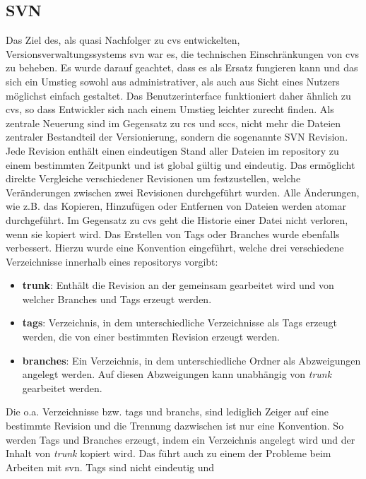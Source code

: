 \subsection{SVN}\label{sec:svn}
Das Ziel des, als quasi Nachfolger zu \acrshort{cvs} entwickelten,
Versionsverwaltungssystems \acrfull{svn} war es, die technischen
Einschränkungen von \acrshort{cvs} zu beheben. Es wurde darauf geachtet, dass
es als Ersatz fungieren kann und das sich ein Umstieg sowohl aus
administrativer, als auch aus Sicht eines Nutzers möglichst einfach gestaltet.
Das Benutzerinterface funktioniert daher ähnlich zu \acrshort{cvs}, so dass
Entwickler sich nach einem Umstieg leichter zurecht finden. Als zentrale
Neuerung sind im Gegensatz zu \acrshort{rcs} und \acrshort{sccs}, nicht mehr
die Dateien zentraler Bestandteil der Versionierung, sondern die sogenannte SVN
Revision. Jede Revision enthält einen eindeutigen Stand aller Dateien im
\gls{repository} zu einem bestimmten Zeitpunkt und ist global gültig und
eindeutig. Das ermöglicht direkte Vergleiche verschiedener Revisionen um
festzustellen, welche Veränderungen zwischen zwei Revisionen durchgeführt
wurden. Alle Änderungen, wie z.B. das Kopieren, Hinzufügen oder Entfernen von
Dateien werden atomar durchgeführt. Im Gegensatz zu \acrshort{cvs} geht die
Historie einer Datei nicht verloren, wenn sie kopiert wird. Das Erstellen von
Tags oder Branches wurde ebenfalls verbessert. Hierzu wurde eine Konvention
eingeführt, welche drei verschiedene Verzeichnisse innerhalb eines
\glspl{repository} vorgibt:
\begin{itemize}
\item \textbf{trunk}: Enthält die Revision an der gemeinsam gearbeitet wird
       und von welcher Branches und Tags erzeugt werden.
\item \textbf{tags}: Verzeichnis, in dem unterschiedliche Verzeichnisse als
       Tags erzeugt werden, die von einer bestimmten Revision erzeugt werden.
\item \textbf{branches}: Ein Verzeichnis, in dem unterschiedliche Ordner als
      Abzweigungen angelegt werden. Auf diesen Abzweigungen kann unabhängig von
      \textit{trunk} gearbeitet werden.
\end{itemize}
Die o.a. Verzeichnisse bzw. \glspl{tag} und \glspl{branch}, sind lediglich
Zeiger auf eine bestimmte Revision und die Trennung dazwischen ist nur eine
Konvention. So werden Tags und Branches erzeugt, indem ein Verzeichnis angelegt
wird und der Inhalt von \textit{trunk} kopiert wird. Das führt auch zu einem
der Probleme beim Arbeiten mit \acrlong{svn}. Tags sind nicht eindeutig und
